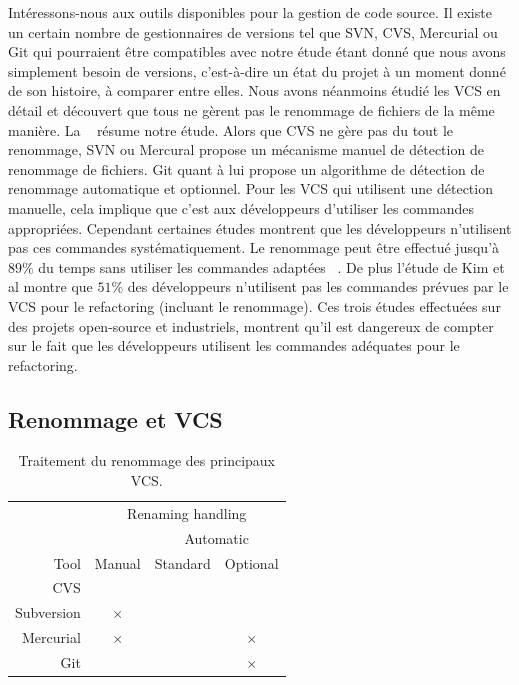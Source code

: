 Intéressons-nous aux outils disponibles pour la gestion de code source. Il existe un certain nombre de gestionnaires de versions tel que SVN, CVS, Mercurial ou Git qui pourraient être compatibles avec notre étude étant donné que nous avons simplement besoin de versions, c'est-à-dire un état du projet à un moment donné de son histoire, à comparer entre elles. Nous avons néanmoins étudié les VCS en détail et découvert que tous ne gèrent pas le renommage de fichiers de la même manière. La ~ résume notre étude. Alors que CVS ne gère pas du tout le renommage, SVN ou Mercural propose un mécanisme manuel de détection de renommage de fichiers. Git quant à lui propose un algorithme de détection de renommage automatique et optionnel. Pour les VCS qui utilisent une détection manuelle, cela implique que c'est aux développeurs d'utiliser les commandes appropriées. Cependant certaines études montrent que les développeurs n'utilisent pas ces commandes systématiquement. Le renommage peut être effectué jusqu'à $89\%$ du temps sans utiliser les commandes adaptées ~\cite{lavoie_inferring_2012,steidl_incremental_2014}. De plus l'étude de Kim et al montre que $51$\% des développeurs n'utilisent pas les commandes prévues par le VCS pour le refactoring (incluant le renommage). Ces trois études effectuées sur des projets open-source et industriels, montrent qu'il est dangereux de compter sur le fait que les développeurs utilisent les commandes adéquates pour le refactoring.\\


\subsection{Renommage et VCS}

\begin{table}[h]
\centering
\begin{tabular}{rccc}
\toprule
 & \multicolumn{3}{c}{Renaming handling}\\
\cmidrule{2-4}
& & \multicolumn{2}{c}{Automatic}\\
\cmidrule{3-4}
Tool & Manual & Standard & Optional\\
\midrule
CVS & & &\\
Subversion & $\times$ & &\\
Mercurial & $\times$ & & $\times$\\
Git & & & $\times$\\
\bottomrule
\end{tabular}
\caption{Traitement du renommage des principaux VCS.}
\label{tab:vcs}
\end{table}


